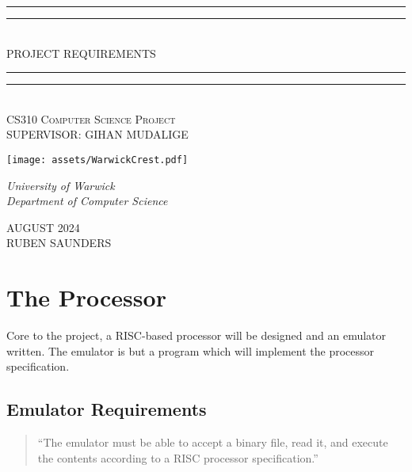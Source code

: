 \documentclass{article}
\newlength{\drop}
\begin{document}
\begin{titlepage}
    \textheight
    \centering
    \vspace*{\baselineskip}
    \rule{\textwidth}{1.6pt}\vspace*{-\baselineskip}\vspace*{2pt}
    \rule{\textwidth}{0.4pt}\\[\baselineskip]
    {\LARGE PROJECT REQUIREMENTS}\\[0.2\baselineskip]
    \rule{\textwidth}{0.4pt}\vspace*{-\baselineskip}\vspace{3.2pt}
    \rule{\textwidth}{1.6pt}\\[\baselineskip]
    \scshape
    CS310 Computer Science Project\\
    SUPERVISOR: GIHAN MUDALIGE\par
    \vspace*{2\baselineskip}
    \texttt{[image: assets/WarwickCrest.pdf]}\\
    \vspace*{\baselineskip}
    {\itshape University of Warwick \\ Department of Computer Science\par}
    \vfill
    {\scshape AUGUST 2024} \\
    {\large RUBEN SAUNDERS}\par
\end{titlepage}

\newpage

\section{The Processor}

Core to the project, a RISC-based processor will be designed and an emulator written.
The emulator is but a program which will implement the processor specification.

\subsection{Emulator Requirements}

\begin{quote}
    ``The emulator must be able to accept a binary file, read it, and execute the contents according to a RISC processor specification.''
\end{quote}
\end{document}

